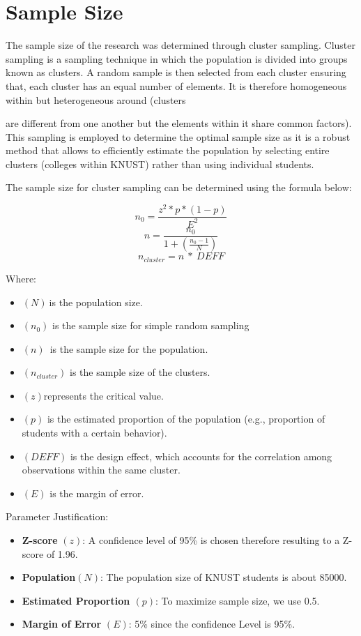 \documentclass[12pt]{report} %
\begin{document}
\section{Sample Size}

The sample size of the research was determined through cluster sampling. Cluster sampling is a sampling technique in which the population is divided into groups known as clusters. A random sample is then selected from each cluster ensuring that, each cluster has an equal number of elements. It is therefore homogeneous within but heterogeneous around (clusters 

are different from one another but the elements within it share common factors). This sampling is employed to determine the optimal sample size as it is a robust method that allows to efficiently estimate the population by selecting entire clusters (colleges within KNUST) rather than using individual students.

The sample size for cluster sampling can be determined using the formula below:

\[n_0=\frac{z^2\ast p\ast\left(1-p\right)}{E^2}\]
\[n=\frac{n_0}{1+(\frac{n_0-1}{N})}\]
\[n_{cluster}=n\ \ast\ DEFF\]

Where:
\begin{itemize}
    \item \((N)\ \)is the population size.
    \item \((n_0)\) is the sample size for simple random sampling
    \item \((n)\)\ is the sample size for the population.
    \item \((n_{cluster})\) is the sample size of the clusters.
    \item \((z) \)represents the critical value.
    \item \((p)\) is the estimated proportion of the population (e.g., proportion of students with a certain behavior).
    \item \((DEFF) \) is the design effect, which accounts for the correlation among observations within the same cluster.
    \item \((E) \) is the margin of error.
\end{itemize}

Parameter Justification:

\begin{itemize}
    \item \textbf{Z-score} \((z)\): A confidence level of 95\% is chosen therefore resulting to a Z-score of 1.96.
    \item \textbf{Population}\( (N)\): The population size of KNUST students is about 85000.
    \item \textbf{Estimated Proportion \((p)\)}: To maximize sample size, we use 0.5.
    \item \textbf{Margin of Error }\((E)\): 5\% since the confidence Level is 95\%.


\end{itemize}
\end{document}
